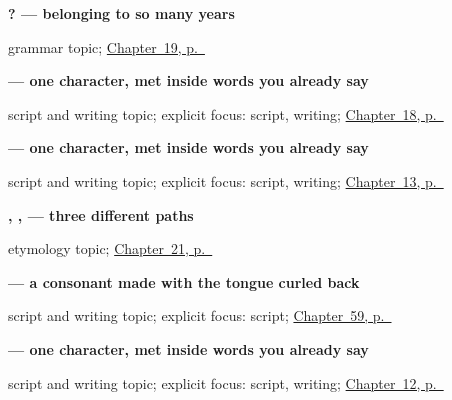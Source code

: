 \noindent\begin{minipage}[t]{\linewidth}
\raggedright
\textbf{   ? — belonging to so many years}\par
\footnotesize grammar topic; \hyperref[ch:hi-asking-age]{Chapter~19, p.~\pageref*{ch:hi-asking-age}}
\end{minipage}\par\smallskip

\noindent\begin{minipage}[t]{\linewidth}
\raggedright
\textbf{ — one character, met inside words you already say}\par
\footnotesize script and writing topic; explicit focus: script, writing; \hyperref[ch:hi-telling-time]{Chapter~18, p.~\pageref*{ch:hi-telling-time}}
\end{minipage}\par\smallskip

\noindent\begin{minipage}[t]{\linewidth}
\raggedright
\textbf{ — one character, met inside words you already say}\par
\footnotesize script and writing topic; explicit focus: script, writing; \hyperref[ch:hi-head-and-hand]{Chapter~13, p.~\pageref*{ch:hi-head-and-hand}}
\end{minipage}\par\smallskip

\noindent\begin{minipage}[t]{\linewidth}
\raggedright
\textbf{, ,  — three different paths}\par
\footnotesize etymology topic; \hyperref[ch:hi-numbers-six-to-ten]{Chapter~21, p.~\pageref*{ch:hi-numbers-six-to-ten}}
\end{minipage}\par\smallskip

\noindent\begin{minipage}[t]{\linewidth}
\raggedright
\textbf{ — a consonant made with the tongue curled back}\par
\footnotesize script and writing topic; explicit focus: script; \hyperref[ch:hi-script-second-wave]{Chapter~59, p.~\pageref*{ch:hi-script-second-wave}}
\end{minipage}\par\smallskip

\noindent\begin{minipage}[t]{\linewidth}
\raggedright
\textbf{ — one character, met inside words you already say}\par
\footnotesize script and writing topic; explicit focus: script, writing; \hyperref[ch:hi-family]{Chapter~12, p.~\pageref*{ch:hi-family}}
\end{minipage}\par\smallskip

